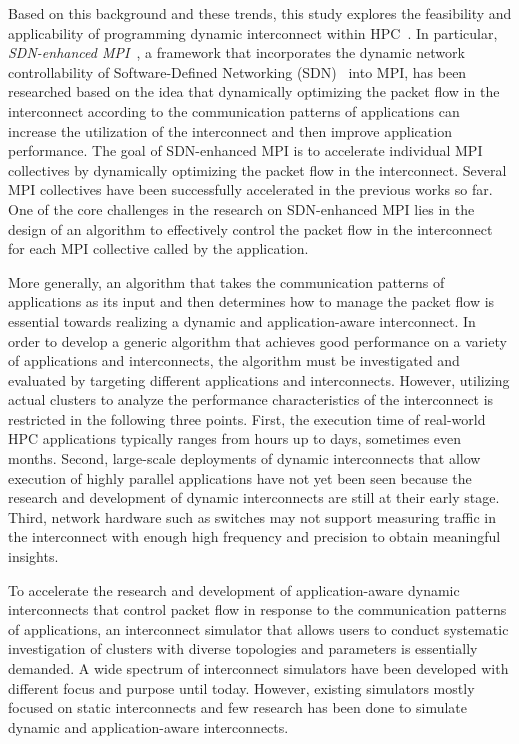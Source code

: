 Based on this background and these trends, this study explores the feasibility
and applicability of programming dynamic interconnect within
HPC~\autocite{Date2016}. In particular, \emph{SDN-enhanced
MPI}~\autocite{Takahashi2014,Dashdavaa2013}, a framework that incorporates
the dynamic network controllability of Software-Defined Networking
(SDN)~\autocite{sdn} into MPI, has been researched based on the idea that
dynamically optimizing the packet flow in the interconnect according to the
communication patterns of applications can increase the utilization of the
interconnect and then improve application performance. The goal of
SDN-enhanced MPI is to accelerate individual MPI collectives by dynamically
optimizing the packet flow in the interconnect. Several MPI collectives have
been successfully accelerated in the previous works so far. One of the core
challenges in the research on SDN-enhanced MPI lies in the design of an
algorithm to effectively control the packet flow in the interconnect for each
MPI collective called by the application.

More generally, an algorithm that takes the communication patterns of
applications as its input and then determines how to manage the packet flow
is essential towards realizing a dynamic and application-aware interconnect.
In order to develop a generic algorithm that achieves good performance on a
variety of applications and interconnects, the algorithm must be investigated
and evaluated by targeting different applications and interconnects. However,
utilizing actual clusters to analyze the performance characteristics of the
interconnect is restricted in the following three points. First, the execution
time of real-world HPC applications typically ranges from hours up to days,
sometimes even months. Second, large-scale deployments of dynamic
interconnects that allow execution of highly parallel applications have not
yet been seen because the research and development of dynamic interconnects
are still at their early stage. Third, network hardware such as switches may
not support measuring traffic in the interconnect with enough high frequency
and precision to obtain meaningful insights.

To accelerate the research and development of application-aware dynamic
interconnects that control packet flow in response to the communication
patterns of applications, an interconnect simulator that allows users to
conduct systematic investigation of clusters with diverse topologies and
parameters is essentially demanded. A wide spectrum of interconnect
simulators have been developed with different focus and purpose until
today. However, existing simulators mostly focused on static
interconnects and few research has been done to simulate dynamic and
application-aware interconnects.

